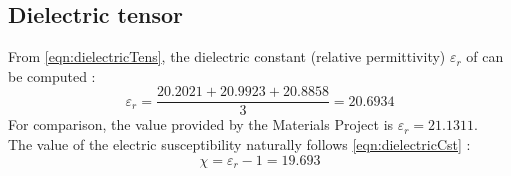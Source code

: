 \documentclass[11pt,a4paper]{article}
\begin{document}
\subsection{Dielectric tensor}

From \autoref{eqn:dielectricTens}, the dielectric constant (relative permittivity) $\varepsilon_{r}$ of  can be computed :  
\begin{equation}
\label{eqn:dielectricCst}
\varepsilon_{r} = \dfrac{20.2021+20.9923+20.8858}{3} = 20.6934
\end{equation}
For comparison, the value provided by the Materials Project is $\varepsilon_r = 21.1311$. \\
The value of the electric susceptibility naturally follows \autoref{eqn:dielectricCst} : 
\begin{equation}
\label{eqn:electricSusc}
\chi = \varepsilon_r-1 = 19.693
\end{equation}
\end{document}
